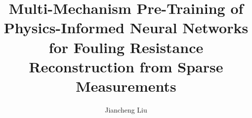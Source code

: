 \documentclass[review]{elsarticle}
\begin{document}
\begin{frontmatter}

\title{Multi-Mechanism Pre-Training of Physics-Informed Neural Networks for Fouling Resistance Reconstruction from Sparse Measurements}

\author[1]{Jiancheng Liu}

\address[1]{College of Chemical and Biological Engineering, Zhejiang University, Hangzhou 310058, China}


\end{frontmatter}
\end{document}
